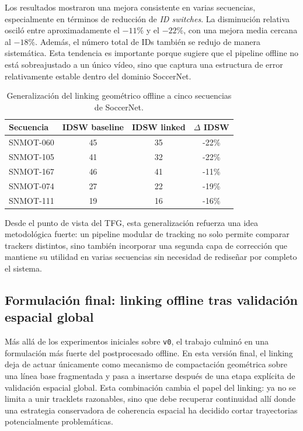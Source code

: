 \documentclass[../MAIN.tex]{subfiles}
\begin{document}
	Los resultados mostraron una mejora consistente en varias secuencias, especialmente en términos de reducción de \textit{ID switches}. La disminución relativa osciló entre aproximadamente el \(-11\%\) y el \(-22\%\), con una mejora media cercana al \(-18\%\). Además, el número total de IDs también se redujo de manera sistemática. Esta tendencia es importante porque sugiere que el pipeline offline no está sobreajustado a un único vídeo, sino que captura una estructura de error relativamente estable dentro del dominio SoccerNet.
	
	\begin{table}[H]
		\centering
		\caption{Generalización del linking geométrico offline a cinco secuencias de SoccerNet.}
		\label{tab:cap10_generalizacion}
		\begin{tabular}{lccc}
			\toprule
			\textbf{Secuencia} & \textbf{IDSW baseline} & \textbf{IDSW linked} & \textbf{$\Delta$ IDSW} \\
			\midrule
			SNMOT-060 & 45 & 35 & -22\% \\
			SNMOT-105 & 41 & 32 & -22\% \\
			SNMOT-167 & 46 & 41 & -11\% \\
			SNMOT-074 & 27 & 22 & -19\% \\
			SNMOT-111 & 19 & 16 & -16\% \\
			\bottomrule
		\end{tabular}
	\end{table}
	
	Desde el punto de vista del TFG, esta generalización refuerza una idea metodológica fuerte: un pipeline modular de tracking no solo permite comparar trackers distintos, sino también incorporar una segunda capa de corrección que mantiene su utilidad en varias secuencias sin necesidad de rediseñar por completo el sistema.
	
	\subsection{Formulación final: linking offline tras validación espacial global}
	
	Más allá de los experimentos iniciales sobre \texttt{v0}, el trabajo culminó en una formulación más fuerte del postprocesado offline. En esta versión final, el linking deja de actuar únicamente como mecanismo de compactación geométrica sobre una línea base fragmentada y pasa a insertarse después de una etapa explícita de validación espacial global. Esta combinación cambia el papel del linking: ya no se limita a unir tracklets razonables, sino que debe recuperar continuidad allí donde una estrategia conservadora de coherencia espacial ha decidido cortar trayectorias potencialmente problemáticas.
	
\end{document}
